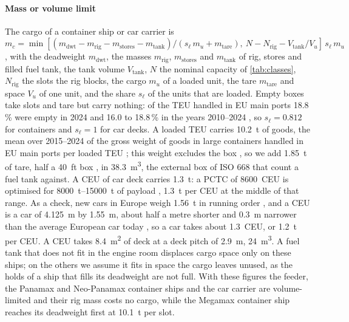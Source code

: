 \paragraph{Mass or volume limit} The cargo of a container ship or car carrier is $m_c=\min[(m_\mathrm{dwt}-m_\mathrm{rig}-m_\mathrm{stores}-m_\mathrm{tank})/(s_\ell\,m_u+m_\mathrm{tare}),\ N-N_\mathrm{rig}-V_\mathrm{tank}/V_u]\,s_\ell\,m_u$, with the deadweight $m_\mathrm{dwt}$, the masses $m_\mathrm{rig}$, $m_\mathrm{stores}$ and $m_\mathrm{tank}$ of rig, stores and filled fuel tank, the tank volume $V_\mathrm{tank}$, $N$ the nominal capacity of \cref{tab:classes}, $N_\mathrm{rig}$ the slots the rig blocks, the cargo $m_u$ of a loaded unit, the tare $m_\mathrm{tare}$ and space $V_u$ of one unit, and the share $s_\ell$ of the units that are loaded. Empty boxes take slots and tare but carry nothing: of the TEU handled in EU main ports 18.8\,\% were empty in 2024 and 16.0 to 18.8\,\% in the years 2010--2024 \citep{eurostat_mar_mg_am_cvh}, so $s_\ell=0.812$ for containers and $s_\ell=1$ for car decks. A loaded TEU carries \SI{10.2}{t} of goods, the mean over 2015--2024 of the gross weight of goods in large containers handled in EU main ports \citep{eurostat_mar_mg_am_cwhc} per loaded TEU \citep{eurostat_mar_mg_am_cvh}; this weight excludes the box \citep{eurostat_maritime_manual}, so we add \SI{1.85}{t} of tare, half a \SI{40}{ft} box \citep{hapaglloyd_container_spec,eurostat_maritime_manual}, in \SI{38.3}{m^3}, the external box of ISO 668 that \citet{mao2020icct} count a fuel tank against. A CEU of car deck carries \SI{1.3}{t}: a PCTC of \num{8600}~CEU is optimised for \SIrange{8000}{15000}{t} of payload \citep{keh_8600ceu_df_pctc}, \SI{1.3}{t} per CEU at the middle of that range. As a check, new cars in Europe weigh \SI{1.56}{t} in running order \citep{icct2025_eea_brief}, and a CEU is a car of \SI{4.125}{m} by \SI{1.55}{m}, about half a metre shorter and \SI{0.3}{m} narrower than the average European car today \citep{portantwerpbruges2024_ceu}, so a car takes about 1.3~CEU, or \SI{1.2}{t} per CEU. A CEU takes \SI{8.4}{m^2} of deck \citep{keh_8600ceu_df_pctc} at a deck pitch of \SI{2.9}{m}, \SI{24}{m^3}. A fuel tank that does not fit in the engine room displaces cargo space only on these ships; on the others we assume it fits in space the cargo leaves unused, as the holds of a ship that fills its deadweight are not full. With these figures the feeder, the Panamax and Neo-Panamax container ships and the car carrier are volume-limited and their rig mass costs no cargo, while the Megamax container ship reaches its deadweight first at \SI{10.1}{t} per slot.

